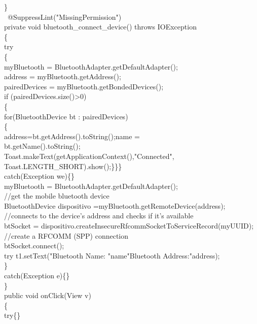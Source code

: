 \documentclass[12pt,a4paper]{report}
\begin{document}
{{{{{{{{       \}\\
   \ @SuppressLint("MissingPermission")\\
    private void bluetooth\_connect\_device() throws IOException\\
    \{\\
        try\\
        \{\\
            myBluetooth = BluetoothAdapter.getDefaultAdapter();\\
            address = myBluetooth.getAddress();\\
            pairedDevices = myBluetooth.getBondedDevices();\\
            if (pairedDevices.size()>0)\\
            \{\\
                for(BluetoothDevice bt : pairedDevices)\\
                \{\\
                    address=bt.getAddress().toString();name =\\
                     bt.getName().toString();\\
                    Toast.makeText(getApplicationContext(),"Connected",\\
                     Toast.LENGTH\_SHORT).show();\}\}\} \\
        catch(Exception we)\{\}\\
        myBluetooth = BluetoothAdapter.getDefaultAdapter();\\
        //get the mobile bluetooth device\\
        BluetoothDevice dispositivo =myBluetooth.getRemoteDevice(address);\\
         //connects to the device's address and checks if it's available\\
        btSocket = dispositivo.createInsecureRfcommSocketToServiceRecord(myUUID);\\
        //create a RFCOMM (SPP) connection\\
        btSocket.connect();\\
        try { t1.setText("Bluetooth Name: "name"Bluetooth Address:"address);\\
         \}\\
        catch(Exception e)\{\}\\
    \}\\
    public void onClick(View v)\\
    \{\\
        try\{\}\\
}}}}}}}}}
\end{document}
